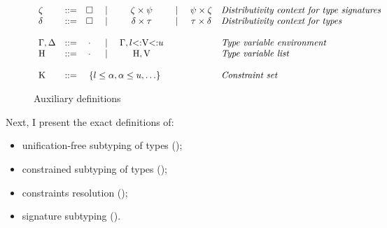 
\begin{figure}
\footnotesize
\[
\begin{array}{lccccccl}
    \dctxtysig &::=& \square &
        \Alt& \typair{\dctxtysig}{\tysig} &
        \Alt& \typair{\tysig}{\dctxtysig} &
        \textit{Distributivity context for type signatures}
    \\
    \dctxty &::=& \square &
        \Alt& \typair{\dctxty}{\ty} &
        \Alt& \typair{\ty}{\dctxty} &
        \textit{Distributivity context for types}
    \\
    \\
    \AEnv, \UEnv &::=& \EmptyEnv &
        \Alt& \AEnv, \varbound{\vany}{\tylb}{\tyub} &
        & & 
        \textit{Type variable environment}
    \\
    \UEnvD &::=& \EmptyEnv &
        \Alt& \UEnvD, \vany &
        & & 
        \textit{Type variable list}
    \\
    \\
    \CSet &::=& \multicolumn{3}{c}{
            \ctrset{\ctrsub{\tylb}{\va}, \ctrsub{\va}{\tyub}, \ldots}
        } & & &
        \textit{Constraint set}
\end{array}
\]
\caption{Auxiliary definitions}\label{fig:subty-aux}
\end{figure}


Next, I present the exact definitions of:
\begin{itemize}
    \item unification-free subtyping of types 
        ();
    \item constrained subtyping of types 
        ();
    \item constraints resolution \solvectrdflt 
        ();
    \item signature subtyping 
        ().
\end{itemize}


